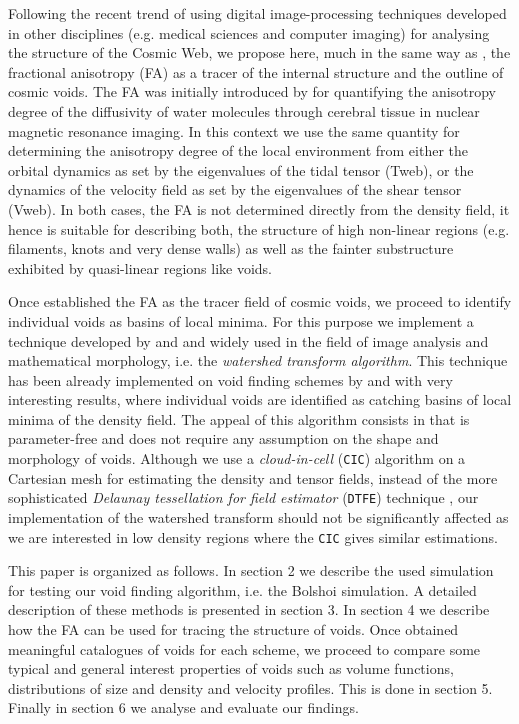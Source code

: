 \documentclass[a4,useAMS,usenatbib,usegraphicx]{latex/mn2e}
\begin{document}
Following the recent trend of using digital image-processing techniques 
developed in other disciplines (e.g. medical sciences and computer imaging) 
for analysing the structure of the Cosmic Web, we propose here, much in 
the same way as \citet{Libeskind13}, the fractional anisotropy (FA) as a 
tracer of the internal structure and the outline of cosmic voids. The FA 
was initially introduced by \citet{Basser95} for quantifying the 
anisotropy degree of the diffusivity of water molecules through cerebral
tissue in nuclear magnetic resonance imaging. In this context we use the 
same quantity for determining the anisotropy degree of the local 
environment from either the orbital dynamics as set by the eigenvalues of
the tidal tensor (Tweb), or the dynamics of the velocity field as set by 
the eigenvalues of the shear tensor (Vweb). In both cases, the FA is not
determined directly from the density field, it hence is suitable for 
describing both, the structure of high non-linear regions (e.g. filaments,
knots and very dense walls) as well as the fainter substructure exhibited 
by quasi-linear regions like voids.


Once established the FA as the tracer field of cosmic voids, we proceed to
identify individual voids as basins of local minima. For this purpose we
implement a technique developed by \citet{Beucher79} and \citet{Beucher93} 
and widely used in the field of image analysis and mathematical morphology, 
i.e. the \textit{watershed transform algorithm}. This technique has been 
already implemented on void finding schemes by \citet{Platen07} and 
\citet{Neyrinck08} with very interesting results, where individual voids 
are identified as catching basins of local minima of the density field. 
The appeal of this algorithm consists in that is parameter-free and does 
not require any assumption on the shape and morphology of voids. 
Although we use a \textit{cloud-in-cell} (\texttt{CIC}) algorithm on a 
Cartesian mesh for estimating the density and tensor fields, instead of 
the more sophisticated \textit{Delaunay tessellation for field estimator} 
(\texttt{DTFE}) technique \citep{Schaap00}, our implementation of the 
watershed transform should not be significantly affected as we are 
interested in low density regions where the \texttt{CIC} gives similar 
estimations.


This paper is organized as follows. In section 2 we describe the used
simulation for testing our void finding algorithm, i.e. the Bolshoi
simulation. A detailed description of these methods is presented in 
section 3. In section 4 we describe how the FA can be used for tracing the 
structure of voids. Once obtained meaningful catalogues of voids for each 
scheme, we proceed to compare some typical and general interest properties 
of voids such as volume functions, distributions of size and density and 
velocity profiles. This is done in section 5. Finally in section 6 we 
analyse and evaluate our findings.
\end{document}
